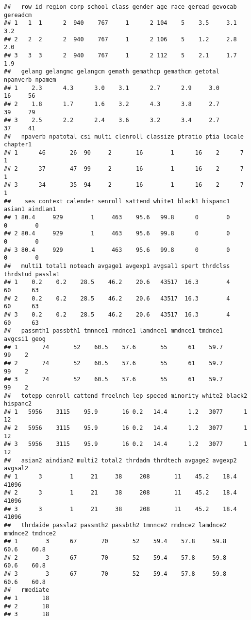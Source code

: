\documentclass[
]{book}
\begin{document}
\begin{verbatim}
##   row id region corp school class gender age race geread gevocab gereadcm
## 1   1  1      2  940    767     1      2 104    5    3.5     3.1      3.2
## 2   2  2      2  940    767     1      2 106    5    1.2     2.8      2.0
## 3   3  3      2  940    767     1      2 112    5    2.1     1.7      1.9
##   gelang gelangmc gelangcm gemath gemathcp gemathcm getotal npanverb npamem
## 1    2.3      4.3      3.0    3.1      2.7      2.9     3.0       16     56
## 2    1.8      1.7      1.6    3.2      4.3      3.8     2.7       39     79
## 3    2.5      2.2      2.4    3.6      3.2      3.4     2.7       37     41
##   npaverb npatotal csi multi clenroll classize ptratio ptia locale chapter1
## 1      46       26  90     2       16        1      16    2      7        1
## 2      37       47  99     2       16        1      16    2      7        1
## 3      34       35  94     2       16        1      16    2      7        1
##    ses context calender senroll sattend white1 black1 hispanc1 asian1 aindian1
## 1 80.4     929        1     463    95.6   99.8      0        0      0        0
## 2 80.4     929        1     463    95.6   99.8      0        0      0        0
## 3 80.4     929        1     463    95.6   99.8      0        0      0        0
##   multi1 total1 noteach avgage1 avgexp1 avgsal1 spert thrdclss thrdstud passla1
## 1    0.2    0.2    28.5    46.2    20.6   43517  16.3        4       60      63
## 2    0.2    0.2    28.5    46.2    20.6   43517  16.3        4       60      63
## 3    0.2    0.2    28.5    46.2    20.6   43517  16.3        4       60      63
##   passmth1 passbth1 tmnnce1 rmdnce1 lamdnce1 mmdnce1 tmdnce1 avgcsi1 geog
## 1       74       52    60.5    57.6       55      61    59.7      99    2
## 2       74       52    60.5    57.6       55      61    59.7      99    2
## 3       74       52    60.5    57.6       55      61    59.7      99    2
##   totepp cenroll cattend freelnch lep speced minority white2 black2 hispanc2
## 1   5956    3115    95.9       16 0.2   14.4      1.2   3077      1       12
## 2   5956    3115    95.9       16 0.2   14.4      1.2   3077      1       12
## 3   5956    3115    95.9       16 0.2   14.4      1.2   3077      1       12
##   asian2 aindian2 multi2 total2 thrdadm thrdtech avgage2 avgexp2 avgsal2
## 1      3        1     21     38     208       11    45.2    18.4   41096
## 2      3        1     21     38     208       11    45.2    18.4   41096
## 3      3        1     21     38     208       11    45.2    18.4   41096
##   thrdaide passla2 passmth2 passbth2 tmnnce2 rmdnce2 lamdnce2 mmdnce2 tmdnce2
## 1        3      67       70       52    59.4    57.8     59.8    60.6    60.8
## 2        3      67       70       52    59.4    57.8     59.8    60.6    60.8
## 3        3      67       70       52    59.4    57.8     59.8    60.6    60.8
##   rmediate
## 1       18
## 2       18
## 3       18
\end{verbatim}
\end{document}
